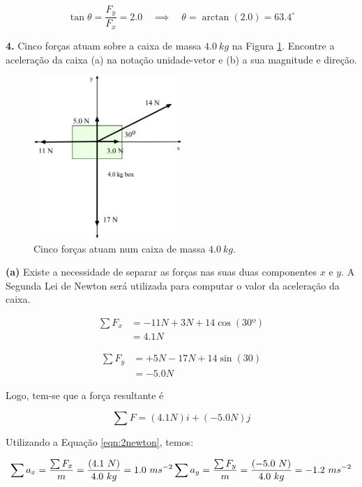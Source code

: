 $$
\tan \theta = \frac{F_y}{F_x} = 2.0 \quad \implies \quad \theta = \arctan(2.0)=63.4^{\circ}
$$

\textbf{4.} Cinco forças atuam sobre a caixa de massa $4.0\ kg$ na Figura \ref{fig:4caixa}. Encontre a aceleração da caixa (a) na notação unidade-vetor e (b) a sua magnitude e direção.
\linebreak
\begin{figure}[h!]
    \centering
    \includegraphics[width=0.5\textwidth]{forças/fig/ex4.png}
    \caption{Cinco forças atuam num caixa de massa $4.0\ kg$.}
    \label{fig:4caixa}
\end{figure}


\textbf{(a)} Existe a necessidade de separar as forças nas suas duas componentes $x$ e $y$. A Segunda Lei de Newton será utilizada para computar o valor da aceleração da caixa.

$$
\begin{aligned}
    \sum F_x&=-11N+3N+14\cos(30º) \\
    &=4.1N
\end{aligned}
$$

$$
\begin{aligned}
    \sum F_y&=+5N-17N+14\sin(30) \\
    &=-5.0N
\end{aligned}
$$

Logo, tem-se que a força resultante é

$$
\sum F=(4.1N)i+(-5.0N)j
$$

Utilizando a Equação \ref{eqn:2newton}, temos:

$$
    \sum a_x=\frac{\sum F_x}{m}=\frac{(4.1\ N)}{4.0\ kg}=1.0\ ms^{-2} \\
    \sum a_y=\frac{\sum F_y}{m}=\frac{(-5.0\ N)}{4.0\ kg}=-1.2\ ms^{-2} \\
$$


